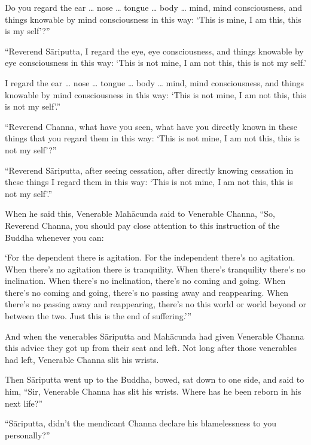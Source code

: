 \documentclass[12pt,openany]{book}%
\begin{document}
Do you regard the ear … nose … tongue … body … mind, mind consciousness, and things knowable by mind consciousness in this way: ‘This is mine, I am this, this is my self’?” 

“Reverend \textsanskrit{Sāriputta}, I regard the eye, eye consciousness, and things knowable by eye consciousness in this way: ‘This is not mine, I am not this, this is not my self.’ 

I regard the ear … nose … tongue … body … mind, mind consciousness, and things knowable by mind consciousness in this way: ‘This is not mine, I am not this, this is not my self’.” 

“Reverend Channa, what have you seen, what have you directly known in these things that you regard them in this way: ‘This is not mine, I am not this, this is not my self’?” 

“Reverend \textsanskrit{Sāriputta}, after seeing cessation, after directly knowing cessation in these things I regard them in this way: ‘This is not mine, I am not this, this is not my self’.” 

When he said this, Venerable \textsanskrit{Mahācunda} said to Venerable Channa, “So, Reverend Channa, you should pay close attention to this instruction of the Buddha whenever you can: 

‘For the dependent there is agitation. For the independent there’s no agitation. When there’s no agitation there is tranquility. When there’s tranquility there’s no inclination. When there’s no inclination, there’s no coming and going. When there’s no coming and going, there’s no passing away and reappearing. When there’s no passing away and reappearing, there’s no this world or world beyond or between the two. Just this is the end of suffering.’” 

And when the venerables \textsanskrit{Sāriputta} and \textsanskrit{Mahācunda} had given Venerable Channa this advice they got up from their seat and left. Not long after those venerables had left, Venerable Channa slit his wrists. 

Then \textsanskrit{Sāriputta} went up to the Buddha, bowed, sat down to one side, and said to him, “Sir, Venerable Channa has slit his wrists. Where has he been reborn in his next life?” 

“\textsanskrit{Sāriputta}, didn’t the mendicant Channa declare his blamelessness to you personally?” 
\end{document}
